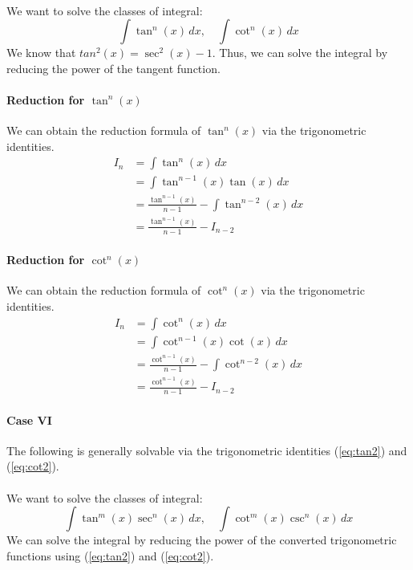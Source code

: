 \documentclass[11pt]{article}
\begin{document}
\paragraph{} We want to solve the classes of integral:
\begin{equation}
    \int \tan^n(x) \, dx, \quad \int \cot^n(x) \, dx 
\end{equation}
We know that $tan^2(x) = \sec^2(x) - 1$. Thus, we can solve the integral by reducing the power of the tangent function.
\paragraph{Reduction for $\tan^n(x)$} We can obtain the reduction formula of $\tan^n(x)$ via the trigonometric identities.
\begin{align}
    I_n &= \int \tan^n(x) \, dx \nonumber \\
    &= \int \tan^{n-1}(x) \tan(x) \, dx \nonumber \\
    &= \frac{\tan^{n-1}(x)}{n-1} - \int \tan^{n-2}(x) \, dx \nonumber \\
    &= \frac{\tan^{n-1}(x)}{n-1} - I_{n-2}
\end{align}
\paragraph{Reduction for $\cot^n(x)$} We can obtain the reduction formula of $\cot^n(x)$ via the trigonometric identities.
\begin{align}
    I_n &= \int \cot^n(x) \, dx \nonumber \\
    &= \int \cot^{n-1}(x) \cot(x) \, dx \nonumber \\
    &= \frac{\cot^{n-1}(x)}{n-1} - \int \cot^{n-2}(x) \, dx \nonumber \\
    &= \frac{\cot^{n-1}(x)}{n-1} - I_{n-2}
\end{align}
\paragraph{Case VI} The following is generally solvable via the trigonometric identities (\ref{eq:tan2}) and (\ref{eq:cot2}).
\paragraph{} We want to solve the classes of integral:
\begin{equation} 
    \int \tan^m(x) \sec^n(x) \, dx, \quad \int \cot^m(x) \csc^n(x) \, dx 
\end{equation}
We can solve the integral by reducing the power of the converted trigonometric functions using (\ref{eq:tan2}) and (\ref{eq:cot2}).
\end{document}
